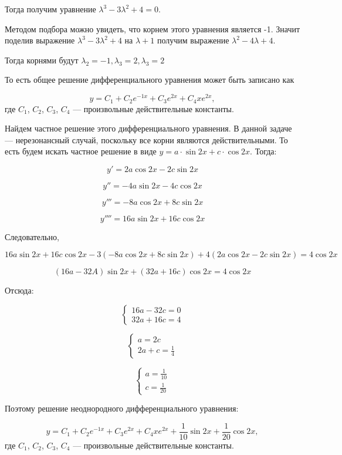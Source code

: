 \documentclass[addpoints, answers]{exam} %
\begin{document}
\begin{questions}
\begin{solution}
Тогда получим уравнение $\lambda ^{3} -3\lambda ^{2} +4=0$.

Методом подбора можно увидеть, что корнем этого уравнения является -1. Значит поделив выражение $\lambda ^{3} -3\lambda ^{2} +4$ на $\lambda +1$ получим выражение $\lambda ^{2} -4\lambda +4$.

Тогда корнями будут $\lambda _{2} =-1,\lambda _{3} =2,\lambda _{3} =2$

То есть общее решение дифференциального уравнения может быть записано как

\[y=C_{1} +C_{2} e^{-1x} +C_{3} e^{2x} +C_{4} xe^{2x} ,\]
где $C_{1}$, $C_2$, $C_3$, $C_4$ --- произвольные действительные константы.

Найдем частное решение этого дифференциального уравнения. В данной задаче --- нерезонансный случай, поскольку все корни являются действительными. То есть будем искать частное решение в виде $y=a\cdot \sin 2x+c\cdot \cos 2x$. Тогда:

\[y' =2a\cos 2x-2c\sin 2x\]

\[y'' =-4a\sin 2x-4c\cos 2x\]

\[y''' =-8a\cos 2x+8c\sin 2x\]

\[y'''' =16a\sin 2x+16c\cos 2x\]

Следовательно,

\[16a\sin 2x+16c\cos 2x-3(-8a\cos 2x+8c\sin 2x)+4(2a\cos 2x-2c\sin 2x)=4\cos 2x\]

\[\left(16a-32A\right)\sin 2x+\left(32a+16c\right)\cos 2x=4\cos 2x\]

Отсюда:

\[\left\{\begin{array}{c} {16a-32c=0} \\ {32a+16c=4} \end{array}\right. \]

\[\left\{\begin{array}{c} {a=2c} \\ {2a+c=\frac{1}{4} } \end{array}\right. \]

\[\left\{\begin{array}{c} {a=\frac{1}{10} } \\ {c=\frac{1}{20} } \end{array}\right. \]

Поэтому решение неоднородного  дифференциального уравнения:

\[y=C_{1} +C_{2} e^{-1x} +C_{3} e^{2x} +C_{4} xe^{2x} +\frac{1}{10} \sin 2x+\frac{1}{20} \cos 2x,\]
где $C_{1}$, $C_2$, $C_3$, $C_4$ --- произвольные действительные константы.



\end{solution}
\end{questions}
\end{document}
